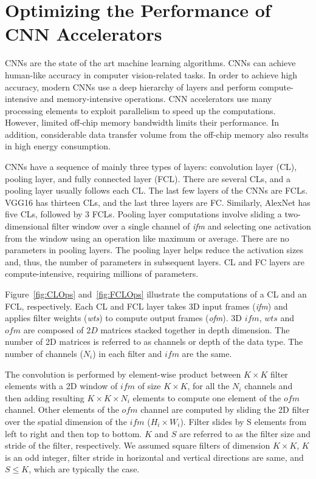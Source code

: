 \graphicspath{{./Ch3-CNN/images/}}

\chapter{Optimizing the Performance of CNN Accelerators} \label{chap:CNN}
CNNs are the state of the art machine learning algorithms. CNNs can achieve human-like accuracy in computer vision-related tasks. In order to achieve high accuracy, modern CNNs use a deep hierarchy of layers and perform compute-intensive and memory-intensive operations. CNN accelerators use many processing elements to exploit parallelism to speed up the computations. However, limited off-chip memory bandwidth limits their performance. In addition, considerable data transfer volume from the off-chip memory also results in high energy consumption.

CNNs have a sequence of mainly three types of layers: convolution layer (CL), pooling layer, and fully connected layer (FCL). There are several CLs, and a pooling layer usually follows each CL. The last few layers of the CNNs are FCLs. VGG16 has thirteen CLs, and the last three layers are FC. Similarly, AlexNet has five CLs, followed by 3 FCLs. Pooling layer computations involve sliding a two-dimensional filter window over a single channel of \textit{ifm} and selecting one activation from the window using an operation like maximum or average. There are no parameters in pooling layers. The pooling layer helps reduce the activation sizes and, thus, the number of parameters in subsequent layers. CL and FC layers are compute-intensive, requiring millions of parameters. 

Figure~\ref{fig:CLOps} and~\ref{fig:FCLOps} illustrate the computations of a CL and an FCL, respectively. Each CL and FCL layer takes 3D input frames (\textit{ifm}) and applies filter weights (\textit{wts}) to compute output frames (\textit{ofm}). 3D $ifm$, $wts$ and $ofm$ are composed of $2D$ matrices stacked together in depth dimension. The number of 2D matrices is referred to as channels or depth of the data type. The number of channels ($N_i$) in each filter and $ifm$ are the same.

The convolution is performed by element-wise product between $K{\times}K$ filter elements with a 2D window of $ifm$ of size $K{\times}K$, for all the $N_i$ channels and then adding resulting $K{\times}K{\times}N_i$ elements to compute one element of the $ofm$ channel. Other elements of the $ofm$ channel are computed by sliding the 2D filter over the spatial dimension of the $ifm$ ($H_i{\times}W_i$). Filter slides by S elements from left to right and then top to bottom. $K$ and $S$ are referred to as the filter size and stride of the filter, respectively. We assumed square filters of dimension $K{\times}K$, $K$ is an odd integer, filter stride in horizontal and vertical directions are same, and $S{\le}K$, which are typically the case. 

